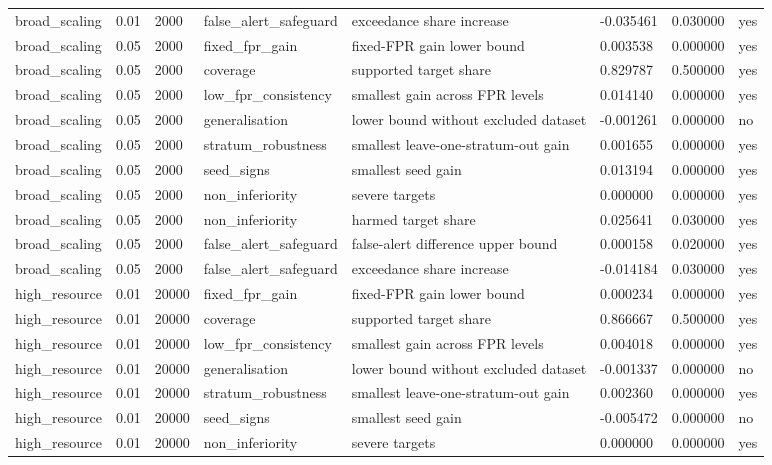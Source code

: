 \begin{tabular}{llllllll}
broad\_scaling & 0.01 & 2000 & false\_alert\_safeguard & exceedance share increase & -0.035461 & 0.030000 & yes \\
broad\_scaling & 0.05 & 2000 & fixed\_fpr\_gain & fixed-FPR gain lower bound & 0.003538 & 0.000000 & yes \\
broad\_scaling & 0.05 & 2000 & coverage & supported target share & 0.829787 & 0.500000 & yes \\
broad\_scaling & 0.05 & 2000 & low\_fpr\_consistency & smallest gain across FPR levels & 0.014140 & 0.000000 & yes \\
broad\_scaling & 0.05 & 2000 & generalisation & lower bound without excluded dataset & -0.001261 & 0.000000 & no \\
broad\_scaling & 0.05 & 2000 & stratum\_robustness & smallest leave-one-stratum-out gain & 0.001655 & 0.000000 & yes \\
broad\_scaling & 0.05 & 2000 & seed\_signs & smallest seed gain & 0.013194 & 0.000000 & yes \\
broad\_scaling & 0.05 & 2000 & non\_inferiority & severe targets & 0.000000 & 0.000000 & yes \\
broad\_scaling & 0.05 & 2000 & non\_inferiority & harmed target share & 0.025641 & 0.030000 & yes \\
broad\_scaling & 0.05 & 2000 & false\_alert\_safeguard & false-alert difference upper bound & 0.000158 & 0.020000 & yes \\
broad\_scaling & 0.05 & 2000 & false\_alert\_safeguard & exceedance share increase & -0.014184 & 0.030000 & yes \\
high\_resource & 0.01 & 20000 & fixed\_fpr\_gain & fixed-FPR gain lower bound & 0.000234 & 0.000000 & yes \\
high\_resource & 0.01 & 20000 & coverage & supported target share & 0.866667 & 0.500000 & yes \\
high\_resource & 0.01 & 20000 & low\_fpr\_consistency & smallest gain across FPR levels & 0.004018 & 0.000000 & yes \\
high\_resource & 0.01 & 20000 & generalisation & lower bound without excluded dataset & -0.001337 & 0.000000 & no \\
high\_resource & 0.01 & 20000 & stratum\_robustness & smallest leave-one-stratum-out gain & 0.002360 & 0.000000 & yes \\
high\_resource & 0.01 & 20000 & seed\_signs & smallest seed gain & -0.005472 & 0.000000 & no \\
high\_resource & 0.01 & 20000 & non\_inferiority & severe targets & 0.000000 & 0.000000 & yes \\

\end{tabular}
